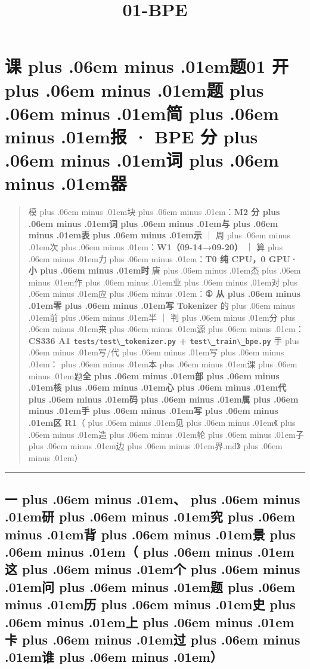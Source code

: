 \documentclass[
]{article}
\title{\zh{课\zhglue 题}01-BPE\zh{分\zhglue 词\zhglue 器}}
\author{}
\date{}
\newcommand{\passthrough}[1]{#1}
\def\zh#1{{\zhfont #1}}
\def\sym#1{{\symfont #1}}
\def\zhglue{\hskip0pt plus .06em minus .01em}
\begin{document}
\maketitle

{
\setcounter{tocdepth}{2}
\tableofcontents
}
\section{\zh{课\zhglue 题}01 \zh{开\zhglue 题\zhglue 简\zhglue 报} \sym{·} BPE \zh{分\zhglue 词\zhglue 器}}\label{ux8bfeux989801-ux5f00ux9898ux7b80ux62a5-bpe-ux5206ux8bcdux5668}

\begin{quote}
\zh{模\zhglue 块\zhglue ：}\textbf{M2 \zh{分\zhglue 词\zhglue 与\zhglue 表\zhglue 示}} \zh{｜} \zh{周\zhglue 次\zhglue ：}\textbf{W1\zh{（}09-14\sym{→}09-20\zh{）}} \zh{｜} \zh{算\zhglue 力\zhglue ：}\textbf{T0 \zh{纯} CPU\zh{，}0 GPU\sym{·}\zh{小\zhglue 时}} \zh{唐\zhglue 杰\zhglue 作\zhglue 业\zhglue 对\zhglue 应\zhglue ：}\textbf{\sym{①} \zh{从\zhglue 零\zhglue 写} Tokenizer} \zh{的\zhglue 前\zhglue 半} \zh{｜} \zh{判\zhglue 分\zhglue 来\zhglue 源\zhglue ：}\textbf{CS336 A1 \passthrough{\lstinline!tests/test\_tokenizer.py!} + \passthrough{\lstinline!test\_train\_bpe.py!}} \zh{手\zhglue 写}/\zh{代\zhglue 写\zhglue ：\zhglue 本\zhglue 课\zhglue 题}\textbf{\zh{全\zhglue 部\zhglue 核\zhglue 心\zhglue 代\zhglue 码\zhglue 属\zhglue 手\zhglue 写\zhglue 区} R1}\zh{（\zhglue 见\zhglue 《\zhglue 造\zhglue 轮\zhglue 子\zhglue 边\zhglue 界}.md\zh{》\zhglue ）}
\end{quote}

\begin{center}\rule{0.5\linewidth}{0.5pt}\end{center}

\subsection{\zh{一\zhglue 、\zhglue 研\zhglue 究\zhglue 背\zhglue 景\zhglue （\zhglue 这\zhglue 个\zhglue 问\zhglue 题\zhglue 历\zhglue 史\zhglue 上\zhglue 卡\zhglue 过\zhglue 谁\zhglue ）}}\label{ux4e00ux7814ux7a76ux80ccux666fux8fd9ux4e2aux95eeux9898ux5386ux53f2ux4e0aux5361ux8fc7ux8c01}
\end{document}
